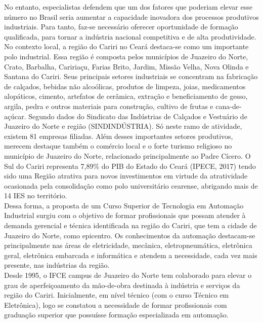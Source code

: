 No entanto, especialistas defendem que um dos fatores que poderiam elevar esse número no Brasil seria aumentar a capacidade inovadora dos processos produtivos industriais. Para tanto, faz-se necessário oferecer oportunidade de formação qualificada, para tornar a indústria nacional competitiva e de alta produtividade.\\

No contexto local, a região do Cariri no Ceará destaca-se como um importante polo industrial. Essa região é composta pelos municípios de Juazeiro do Norte, Crato, Barbalha, Caririaçu, Farias Brito, Jardim, Missão Velha, Nova Olinda e Santana do Cariri. Seus principais setores industriais se concentram na fabricação de calçados, bebidas não alcoólicas, produtos de limpeza, joias, medicamentos alopáticos, cimento, artefatos de cerâmica, extração e beneficiamento de gesso, argila, pedra e outros materiais para construção, cultivo de frutas e cana-de-açúcar. Segundo dados do Sindicato das Indústrias de Calçados e Vestuário de Juazeiro do Norte e região (SINDINDÚSTRIA). Só neste ramo de atividade, existem 81 empresas filiadas. Além desses importantes setores produtivos, merecem destaque também o comércio local e o forte turismo religioso no município de Juazeiro do Norte, relacionado principalmente ao Padre Cícero. O Sul do Cariri representa 7,89\% do PIB do Estado do Ceará (IPECE, 2017) tendo sido uma Região atrativa para novos investimentos em virtude da atratividade ocasionada pela consolidação como polo universitário cearense, abrigando mais de 14 IES no território. \\

Dessa forma, a proposta de um Curso Superior de Tecnologia em Automação Industrial surgiu com o objetivo de formar profissionais que possam atender à demanda gerencial e técnica identificada na região do Cariri, que tem a cidade de Juazeiro do Norte, como epicentro. Os conhecimentos da automação destacam-se principalmente nas áreas de eletricidade, mecânica, eletropneumática, eletrônica geral, eletrônica embarcada e informática e atendem a necessidade, cada vez mais presente, nas indústrias da região.\\

Desde 1995, o IFCE campus de Juazeiro do Norte tem colaborado para elevar o grau de aperfeiçoamento da mão-de-obra destinada à indústria e serviços da região do Cariri. Inicialmente, em nível técnico (com o curso Técnico em Eletrônica), logo se constatou a necessidade de formar profissionais com graduação superior que possuísse formação especializada em automação.\\

